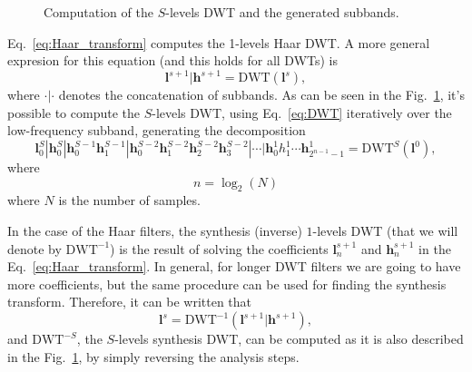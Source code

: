 \begin{figure}
  \centering
  \caption{Computation of the $S$-levels DWT and the generated
    subbands.}
  \label{fig:DWT}
\end{figure}

Eq.~\eqref{eq:Haar_transform} computes the 1-levels Haar DWT. A more
general expresion for this equation (and this holds for all DWTs) is
\begin{equation}
  {\mathbf l}^{s+1} | {\mathbf h}^{s+1} = \text{DWT}({\mathbf l}^s),
  \label{eq:DWT}
\end{equation}
where $\cdot|\cdot$ denotes the concatenation of subbands. As can
be seen in the Fig.~\ref{fig:DWT}, it's possible to compute the
$S$-levels DWT, using Eq.~\eqref{eq:DWT} iteratively over the
low-frequency subband, generating the decomposition
\begin{equation}
  {\mathbf l}^S_0 | {\mathbf h}^S_0 | {\mathbf h}^{S-1}_0 {\mathbf
    h}^{S-1}_1 | {\mathbf h}^{S-2}_0 {\mathbf h}^{S-2}_1 {\mathbf
    h}^{S-2}_2 {\mathbf h}^{S-2}_3 | \cdots | {\mathbf h}^1_0 h^1_1
  \cdots {\mathbf h}^1_{2^{n-1}-1}=\text{DWT}^S({\mathbf l}^0),
  \label{eq:S_levels_DWT}
\end{equation}
where
\begin{equation}
  n = \log_2(N)
\end{equation}
where $N$ is the number of samples.

In the case of the Haar filters, the synthesis (inverse) $1$-levels
DWT (that we will denote by $\text{DWT}^{-1}$) is the result of
solving the coefficients ${\mathbf l}^{s+1}_n$ and ${\mathbf h}^{s+1}_n$ in the
Eq.~\eqref{eq:Haar_transform}. In general, for longer DWT filters we are
going to have more coefficients, but the same procedure can be used
for finding the synthesis transform. Therefore, it can be written that
\begin{equation}
  {\mathbf l}^s = \text{DWT}^{-1}({\mathbf l}^{s+1} | {\mathbf h}^{s+1}),
\end{equation}
and $\text{DWT}^{-S}$, the $S$-levels synthesis DWT, can be computed
as it is also described in the Fig.~\ref{fig:DWT}, by simply reversing
the analysis steps.

